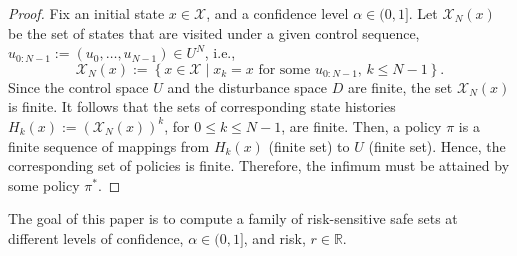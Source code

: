 \documentclass[letterpaper, 10 pt, conference]{ieeeconf}  %
\begin{document}
\begin{proof}
	Fix an initial state $x \in \mathcal{X}$, and a confidence level $\alpha \in (0,1]$. Let $\mathcal{X}_N(x)$ be the set of states that are visited under a given control sequence, $u_{0:N-1} := (u_0, \hdots, u_{N-1}) \in U^{N}$, i.e., 
	\begin{equation*}
	\mathcal{X}_N(x) := \left\{ x \in \mathcal{X} \mid x_k = x \text{ for some } u_{0:N-1},\,k \leq N-1\right\}.
	\end{equation*}
	Since the control space $U$ and the disturbance space $D$ are finite, the set $\mathcal{X}_N(x)$ is finite. It follows that the sets of corresponding state histories $H_k(x) := (\mathcal{X}_N(x))^{k}$, for $0 \leq k \leq N-1$, are finite.  Then, a policy $\pi$ is a finite sequence of mappings from $H_k(x)$ (finite set) to $U$ (finite set). Hence, the corresponding set of policies is finite. Therefore, the infimum must be attained by some policy $\pi^*$.
\end{proof}

The goal of this paper is to compute a family of risk-sensitive safe sets at different levels of confidence, $\alpha \in (0,1]$, and risk, $r \in \mathbb{R}$.

\end{document}
